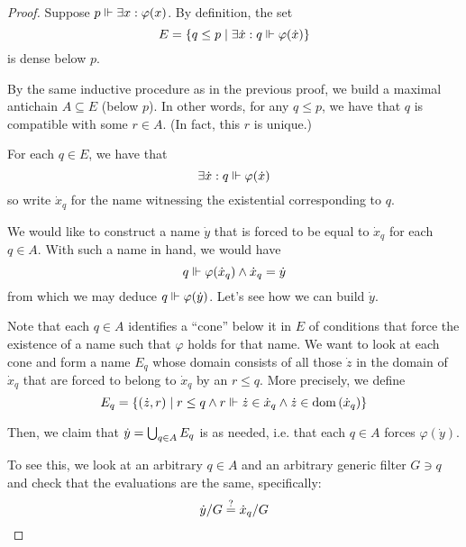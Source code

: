 \documentclass[11pt]{article}
\renewcommand{\phi}{\varphi}
\begin{document}
\begin{proof}
    Suppose $p \forces \exists x : \phi(x)$.
    By definition, the set
    \begin{equation*}
        E = \setof{ q \leq p \sth \exists \dot x : q \forces \phi(\dot x) }
    \end{equation*}
    is dense below $p$.

    By the same inductive procedure as in the previous proof, we build a
    maximal antichain $A \subseteq E$ (below $p$). In other words, for any
    $q \leq p$, we have that $q$ is compatible with some $r \in A$. (In fact,
    this $r$ is unique.)

    For each $q \in E$, we have that
    \begin{equation*}
        \exists \dot x : q \forces \phi(\dot x)
    \end{equation*}
    so write $\dot x_q$ for the name witnessing the existential corresponding
    to $q$.

    We would like to construct a name $\dot y$ that is forced to be equal to
    $\dot x_q$ for each $q \in A$.
    With such a name in hand, we would have
    \begin{equation*}
        q \forces \phi(\dot x_q) \land \dot x_q = \dot y
    \end{equation*}
    from which we may deduce $q \forces \phi(\dot y)$.
    Let's see how we can build $\dot y$.

    Note that each $q \in A$ identifies a ``cone'' below it in $E$ of
    conditions that force the existence of a name such that $\phi$ holds for
    that name. We want to look at each cone and form a name $E_q$ whose domain
    consists of all those $\dot z$ in the domain of $\dot x_q$ that are forced
    to belong to $\dot x_q$ by an $r \leq q$.
    More precisely, we define
    \begin{equation*}
        E_q = \left\{
            (\dot z, r) \;\vert\;
            r \leq q
            \land
            r \Vdash \dot z \in \dot x_q
            \land
            \dot z \in \operatorname{dom}{\left(\dot x_q\right)}
        \right\}
    \end{equation*}

    Then, we claim that $\dot y = \bigcup_{q \in A} E_q$ is as needed,
    i.e. that each $q \in A$ forces $\phi(\dot y)$.

    To see this, we look at an arbitrary $q \in A$ and an arbitrary generic
    filter $G \ni q$ and check that the evaluations are the same, specifically:
    \begin{equation*}
        \dot y / G \overset{?}{=} \dot x_q / G
    \end{equation*}


\end{proof}
\end{document}
